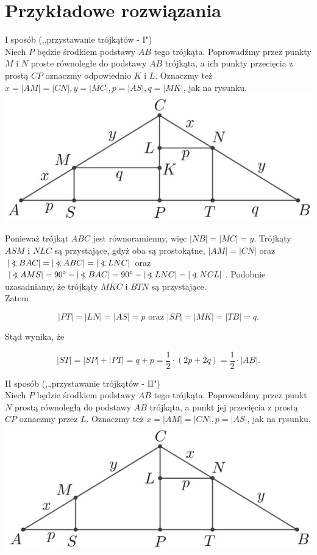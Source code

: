 \documentclass[10pt]{article}
\newcommand\Varangle{\mathop{{<\!\!\!\!\!\text{\small)}}\:}\nolimits}
\begin{document}
\section*{Przykładowe rozwiązania}
I sposób (,,przystawanie trójkątów - I")\\
Niech $P$ będzie środkiem podstawy $A B$ tego trójkąta. Poprowadźmy przez punkty $M$ i $N$ proste równoległe do podstawy $A B$ trójkąta, a ich punkty przecięcia z prostą $C P$ oznaczmy odpowiednio $K$ i $L$. Oznaczmy też $x=|A M|=|C N|, y=|M C|, p=|A S|, q=|M K|$, jak na rysunku.\\
\includegraphics[max width=\textwidth, center]{2025_02_07_d712b9a47aa2c64928dbg-16}

Ponieważ trójkąt $A B C$ jest równoramienny, więc $|N B|=|M C|=y$. Trójkąty $A S M$ i $N L C$ są przystające, gdyż oba są prostokątne, $|A M|=|C N|$ oraz $|\Varangle B A C|=|\Varangle A B C|=|\Varangle L N C|$ oraz $|\Varangle A M S|=90^{\circ}-|\Varangle B A C|=90^{\circ}-|\Varangle L N C|=|\Varangle N C L|$. Podobnie uzasadniamy, że trójkąty $M K C$ i $B T N$ są przystające.\\
Zatem

$$
|P T|=|L N|=|A S|=p \text { oraz }|S P|=|M K|=|T B|=q .
$$

Stąd wynika, że

$$
|S T|=|S P|+|P T|=q+p=\frac{1}{2} \cdot(2 p+2 q)=\frac{1}{2} \cdot|A B| .
$$

II sposób (,„przystawanie trójkątów - II")\\
Niech $P$ będzie środkiem podstawy $A B$ tego trójkąta. Poprowadźmy przez punkt $N$ prostą równoległą do podstawy $A B$ trójkąta, a punkt jej przecięcia z prostą $C P$ oznaczmy przez $L$. Oznaczmy też $x=|A M|=|C N|, p=|A S|$, jak na rysunku.\\
\includegraphics[max width=\textwidth, center]{2025_02_07_d712b9a47aa2c64928dbg-17}
\end{document}
